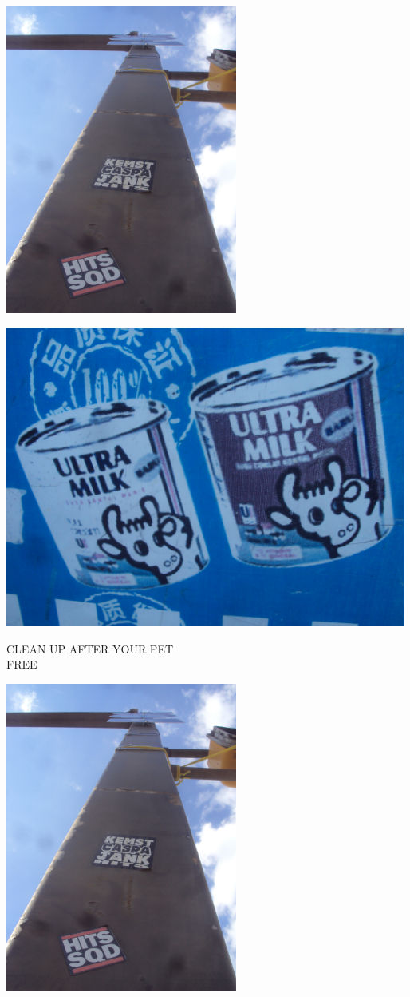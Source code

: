 \documentclass[10pt,letterpaper]{article}
\begin{document}
\includegraphics[height=4in]{portrait.jpg}

\vspace{0.25in}
\includegraphics[width=5.19in]{landscape.jpg}

CLEAN UP AFTER YOUR PET\\
FREE\\
\pagebreak

\includegraphics[height=4in]{portrait.jpg}
\end{document}
